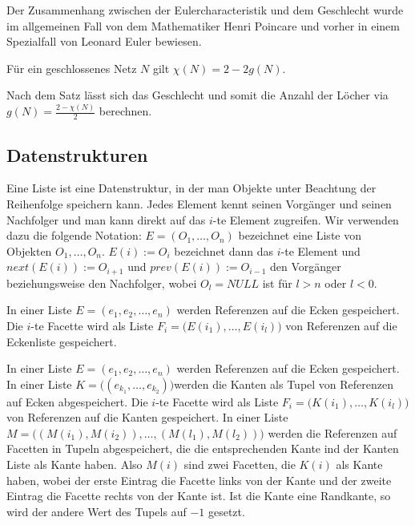 Der Zusammenhang zwischen der Eulercharacteristik und dem Geschlecht wurde im allgemeinen Fall von dem Mathematiker  
Henri Poincare und vorher in einem Spezialfall von Leonard Euler bewiesen. 
\begin{Satz}
Für ein geschlossenes Netz $N$ gilt $\chi(N) = 2 - 2g(N)$. 
\end{Satz}

\begin{Bemerkung}
Nach dem Satz lässt sich das Geschlecht und somit die Anzahl der Löcher via $g(N) = \frac{2- \chi(N)}{2}$ berechnen.
\end{Bemerkung}

\subsection{Datenstrukturen}
\begin{Definition}
Eine Liste ist eine Datenstruktur, in der man Objekte unter Beachtung der Reihenfolge  speichern kann. Jedes Element kennt seinen Vorgänger und seinen Nachfolger und man kann direkt auf das
 $i$-te Element zugreifen. Wir verwenden dazu die folgende Notation:  $E = (O_1, \hdots ,O_n )$ bezeichnet eine Liste von Objekten $O_1, \hdots, O_n$.
$E(i):= O_i$ bezeichnet dann das $i$-te Element und $next(E(i)) := O_{i+1}$ und $prev(E(i)):= O_{i-1}$ den Vorgänger beziehungsweise den Nachfolger, 
wobei $O_{l} = NULL$ ist für $l >n$ oder $l < 0$.

\end{Definition}

\begin{Definition}[Eckenliste]
In einer Liste $E = (e_1, e_2, \hdots, e_n)$ werden Referenzen auf die Ecken gespeichert. Die $i$-te Facette wird als Liste $F_i = \bigl( E(i_1), \hdots , E(i_l)  \bigr)$  von  Referenzen auf die Eckenliste 
gespeichert. 
\end{Definition}

\begin{Definition}[Kantenliste]
In einer Liste $E = (e_1, e_2, \hdots, e_n)$ werden Referenzen auf die Ecken gespeichert. In einer Liste $K=\bigl(   (e_{k_1},   \hdots,  e_{k_2} ) \bigr)$werden die Kanten als Tupel von Referenzen auf Ecken abgespeichert. Die $i$-te Facette wird als Liste $F_i = \bigl( K(i_1), \hdots , K(i_l)  \bigr)$  von  Referenzen auf die Kanten  gespeichert. In einer Liste
$M=  \bigl(    (M(i_1), M(i_2) ), \hdots  ,(M(l_1), M(l_2) )   \bigr )$ werden die Referenzen auf Facetten in Tupeln abgespeichert, die die entsprechenden Kante ind der Kanten Liste als Kante haben.
Also $M(i)$ sind zwei Facetten, die $K(i)$ als Kante haben, wobei der erste Eintrag die Facette links von der Kante und der zweite Eintrag die Facette rechts von der Kante ist. 
Ist die Kante eine Randkante, so wird der andere Wert des Tupels auf  $-1$ gesetzt.
 
\end{Definition}

